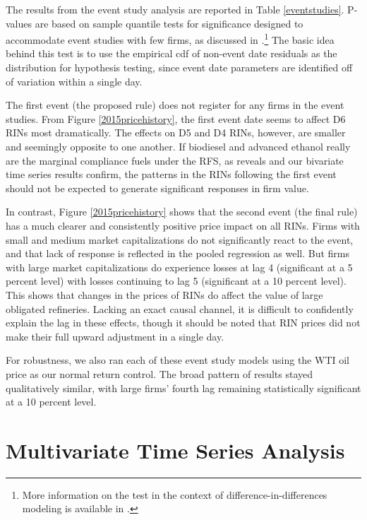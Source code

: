 \documentclass[11pt]{article}
\begin{document}
The results from the event study analysis are reported in Table \ref{eventstudies}. P-values are based on sample quantile tests for significance designed to accommodate event studies with few firms, as discussed in \cite{Gelbach2013}.\footnote{More information on the test in the context of difference-in-differences modeling is available in \cite{Conley2011}.} The basic idea behind this test is to use the empirical cdf of non-event date residuals as the distribution for hypothesis testing, since event date parameters are identified off of variation within a single day.

The first event (the proposed rule) does not register for any firms in the event studies. From Figure \ref{2015pricehistory}, the first event date seems to affect D6 RINs most dramatically. The effects on D5 and D4 RINs, however, are smaller and seemingly opposite to one another. If biodiesel and advanced ethanol really are the marginal compliance fuels under the RFS, as \cite{Lade2018a} reveals and our bivariate time series results confirm, the patterns in the RINs following the first event should not be expected to generate significant responses in firm value.

In contrast, Figure \ref{2015pricehistory} shows that the second event (the final rule) has a much clearer and consistently positive price impact on all RINs. Firms with small and medium market capitalizations do not significantly react to the event, and that lack of response is reflected in the pooled regression as well. But firms with large market capitalizations do experience losses at lag 4 (significant at a 5 percent level) with losses continuing to lag 5 (significant at a 10 percent level). This shows that changes in the prices of RINs do affect the value of large obligated refineries. Lacking an exact causal channel, it is difficult to confidently explain the lag in these effects, though it should be noted that RIN prices did not make their full upward adjustment in a single day. 

For robustness, we also ran each of these event study models using the WTI oil price as our normal return control. The broad pattern of results stayed qualitatively similar, with large firms' fourth lag remaining statistically significant at a 10 percent level.


\section{Multivariate Time Series Analysis}
\end{document}
